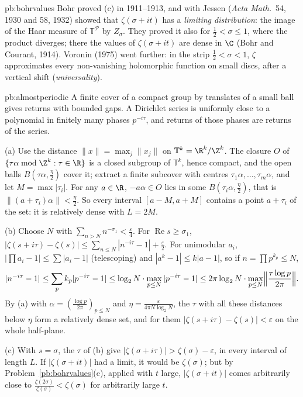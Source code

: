 \begin{solution}{pb:bohrvalues}
\leads Bohr proved (c) in 1911--1913, and with Jessen (\emph{Acta Math.}\ 54, 1930 and 58, 1932) showed that $\zeta(\sigma+it)$ has a \emph{limiting distribution}: the image of the Haar
measure of $\mathbb T^{\mathcal P}$ by $Z_\sigma$. They proved it also for $\frac12<\sigma\le1$, where the product diverges; there the values of $\zeta(\sigma+it)$ are dense in $\C$ (Bohr and Courant, 1914). Voronin
(1975) went further: in the strip $\frac12<\sigma<1$, $\zeta$ approximates every non-vanishing holomorphic function on small discs, after a vertical shift (\emph{universality}).
\end{solution}

\begin{solution}{pb:almostperiodic}
\idea A finite cover of a compact group by translates of a small ball gives returns with bounded gaps. A Dirichlet series is uniformly close to a polynomial in
finitely many phases $p^{-i\tau}$, and returns of those phases are returns of the series.

\writeup (a) Use the distance $\|x\|=\max_j\|x_j\|$ on $\mathbb T^k=\R^k/\Z^k$. The closure $O$ of $\{\tau\alpha\bmod\Z^k:\tau\in\R\}$ is a closed subgroup of $\mathbb T^k$, hence compact,
and the open balls $B(\tau\alpha,\frac\eta2)$ cover it; extract a finite subcover with centres $\tau_1\alpha,\dots,\tau_m\alpha$, and let $M=\max|\tau_i|$. For any $a\in\R$, $-a\alpha\in O$ lies in some
$B(\tau_i\alpha,\frac\eta2)$, that is $\|(a+\tau_i)\alpha\|<\frac\eta2$. So every interval $[a-M,a+M]$ contains a point $a+\tau_i$ of the set: it is relatively dense with $L=2M$.

(b) Choose $N$ with $\sum_{n>N}n^{-\sigma_1}<\frac\varepsilon4$. For $\operatorname{Re}s\ge\sigma_1$,
$|\zeta(s+i\tau)-\zeta(s)|\le\sum_{n\le N}|n^{-i\tau}-1|+\frac\varepsilon2$. For unimodular $a_i$, $|\prod a_i-1|\le\sum|a_i-1|$ (telescoping) and $|a^k-1|\le k|a-1|$, so if $n=\prod p^{k_p}\le N$,
\[
|n^{-i\tau}-1|\le\sum_pk_p|p^{-i\tau}-1|\le\log_2N\cdot\max_{p\le N}|p^{-i\tau}-1|\le2\pi\log_2N\cdot\max_{p\le N}\Bigl\|\frac{\tau\log p}{2\pi}\Bigr\|.
\]
By (a) with $\alpha=(\frac{\log p}{2\pi})_{p\le N}$ and $\eta=\frac\varepsilon{4\pi N\log_2N}$, the $\tau$ with all these distances below $\eta$ form a relatively dense set, and for them
$|\zeta(s+i\tau)-\zeta(s)|<\varepsilon$ on the whole half-plane.

(c) With $s=\sigma$, the $\tau$ of (b) give $|\zeta(\sigma+i\tau)|>\zeta(\sigma)-\varepsilon$, in every interval of length $L$. If $|\zeta(\sigma+it)|$ had a limit, it would be $\zeta(\sigma)$; but by
Problem~\ref{pb:bohrvalues}(c), applied with $t$ large, $|\zeta(\sigma+it)|$ comes arbitrarily close to $\frac{\zeta(2\sigma)}{\zeta(\sigma)}<\zeta(\sigma)$ for arbitrarily large $t$.


\end{solution}

